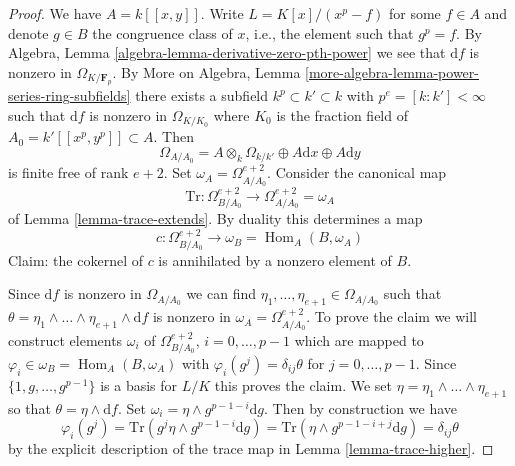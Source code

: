 \documentclass[10pt,a4paper]{amsart}
\theoremstyle{plain}
\theoremstyle{definition}
\theoremstyle{remark}
\numberwithin{equation}{subsection}
\def\Hom{\mathop{\mathrm{Hom}}\nolimits}
\begin{document}
\begin{proof}
We have $A = k[[x, y]]$. Write $L = K[x]/(x^p - f)$ for some $f \in A$
and denote $g \in B$ the congruence class of $x$, i.e., the element such
that $g^p = f$. By Algebra, Lemma \ref{algebra-lemma-derivative-zero-pth-power}
we see that $\text{d}f$ is nonzero in $\Omega_{K/\mathbf{F}_p}$. By
More on Algebra, Lemma \ref{more-algebra-lemma-power-series-ring-subfields}
there exists a subfield $k^p \subset k' \subset k$ with
$p^e = [k : k'] < \infty$ such that $\text{d}f$ is nonzero
in $\Omega_{K/K_0}$ where $K_0$ is the fraction field of
$A_0 = k'[[x^p, y^p]] \subset A$. Then
$$
\Omega_{A/A_0} =
A \otimes_k \Omega_{k/k'} \oplus A \text{d}x \oplus A \text{d}y
$$
is finite free of rank $e + 2$. Set $\omega_A = \Omega^{e + 2}_{A/A_0}$.
Consider the canonical map
$$
\text{Tr} :
\Omega^{e + 2}_{B/A_0}
\longrightarrow
\Omega^{e + 2}_{A/A_0} = \omega_A
$$
of Lemma \ref{lemma-trace-extends}. By duality this determines a map
$$
c : \Omega^{e + 2}_{B/A_0} \to \omega_B = \Hom_A(B, \omega_A)
$$
Claim: the cokernel of $c$ is annihilated by a nonzero element of $B$.

\medskip\noindent
Since $\text{d}f$ is nonzero in $\Omega_{A/A_0}$ we can find
$\eta_1, \ldots, \eta_{e + 1} \in \Omega_{A/A_0}$ such that
$\theta = \eta_1 \wedge \ldots \wedge \eta_{e + 1} \wedge \text{d}f$ is
nonzero in $\omega_A = \Omega^{e + 2}_{A/A_0}$. To prove the claim we
will construct elements $\omega_i$ of $\Omega^{e + 2}_{B/A_0}$,
$i = 0, \ldots, p - 1$ which are mapped to
$\varphi_i \in \omega_B = \Hom_A(B, \omega_A)$
with $\varphi_i(g^j) = \delta_{ij}\theta$ for $j = 0, \ldots, p - 1$.
Since $\{1, g, \ldots, g^{p - 1}\}$ is a basis for $L/K$ this
proves the claim. We set
$\eta = \eta_1 \wedge \ldots \wedge \eta_{e + 1}$
so that $\theta = \eta \wedge \text{d}f$.
Set $\omega_i = \eta \wedge g^{p - 1 - i}\text{d}g$. Then
by construction we have
$$
\varphi_i(g^j) = \text{Tr}(g^j \eta \wedge g^{p - 1 - i}\text{d}g) =
\text{Tr}(\eta \wedge g^{p - 1 - i + j}\text{d}g) = \delta_{ij} \theta
$$
by the explicit description of the trace map in Lemma \ref{lemma-trace-higher}.


\end{proof}
\end{document}
